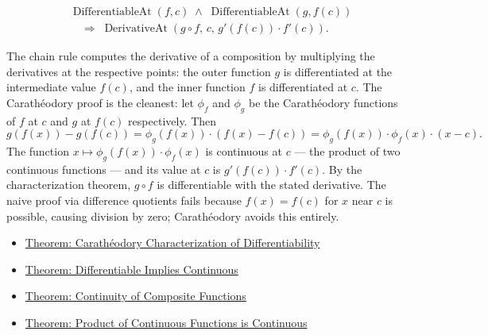 \begin{remark*}
\begin{align*}
&\operatorname{DifferentiableAt}(f,c) \;\land\; \operatorname{DifferentiableAt}(g,f(c))\\
&\quad\Rightarrow\;
\operatorname{DerivativeAt}(g\circ f,\,c,\,g'(f(c))\cdot f'(c)).
\end{align*}
\end{remark*}

\begin{remark*}[Interpretation]
The chain rule computes the derivative of a composition by multiplying the derivatives at the respective points: the outer function $g$ is differentiated at the intermediate value $f(c)$, and the inner function $f$ is differentiated at $c$. The Carathéodory proof is the cleanest: let $\phi_f$ and $\phi_g$ be the Carathéodory functions of $f$ at $c$ and $g$ at $f(c)$ respectively. Then
\[
g(f(x)) - g(f(c)) = \phi_g(f(x))\cdot(f(x)-f(c)) = \phi_g(f(x))\cdot\phi_f(x)\cdot(x-c).
\]
The function $x \mapsto \phi_g(f(x))\cdot\phi_f(x)$ is continuous at $c$ --- the product of two continuous functions --- and its value at $c$ is $g'(f(c))\cdot f'(c)$. By the characterization theorem, $g\circ f$ is differentiable with the stated derivative. The naive proof via difference quotients fails because $f(x) = f(c)$ for $x$ near $c$ is possible, causing division by zero; Carathéodory avoids this entirely.
\end{remark*}

\begin{remark*}[Dependencies]
\begin{itemize}
  \item \hyperref[thm:caratheodory-characterization-of-differentiability]{Theorem: Carathéodory Characterization of Differentiability}
  \item \hyperref[thm:differentiable-implies-continuous]{Theorem: Differentiable Implies Continuous}
  \item \hyperref[thm:continuity-composition]{Theorem: Continuity of Composite Functions}
  \item \hyperref[thm:continuity-product]{Theorem: Product of Continuous Functions is Continuous}
\end{itemize}
\end{remark*}
